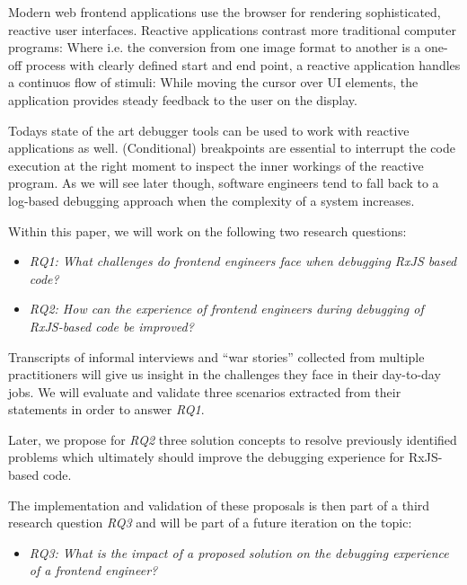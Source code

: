 \documentclass[12pt,a4paper]{article}
\begin{document}
Modern web frontend applications use the browser for rendering sophisticated, reactive user interfaces. Reactive applications contrast more traditional computer programs: Where i.e. the conversion from one image format to another is a one-off process with clearly defined start and end point, a reactive application handles a continuos flow of stimuli: While moving the cursor over UI elements, the application provides steady feedback to the user on the display.

Todays state of the art debugger tools can be used to work with reactive applications as well. (Conditional) breakpoints are essential to interrupt the code execution at the right moment to inspect the inner workings of the reactive program. As we will see later though, software engineers tend to fall back to a log-based debugging approach when the complexity of a system increases.


Within this paper, we will work on the following two research questions:

\begin{itemize}
	\item \emph{RQ1: What challenges do frontend engineers face when debugging RxJS based code?}
	\item \emph{RQ2: How can the experience of frontend engineers during debugging of RxJS-based code be improved?}
\end{itemize}

Transcripts of informal interviews and ``war stories'' collected from multiple practitioners will give us insight in the challenges they face in their day-to-day jobs. We will evaluate and validate three scenarios extracted from their statements in order to answer \emph{RQ1}.

Later, we propose for \emph{RQ2} three solution concepts to resolve previously identified problems which ultimately should improve the debugging experience for RxJS-based code.

The implementation and validation of these proposals is then part of a third research question \emph{RQ3} and will be part of a future iteration on the topic:

\begin{itemize}
	\item \emph{RQ3: What is the impact of a proposed solution on the debugging experience of a frontend engineer?}
\end{itemize}
\end{document}
